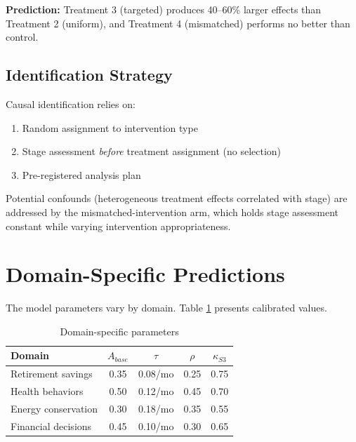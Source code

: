 \documentclass[12pt]{article}
\begin{document}
\textbf{Prediction:} Treatment 3 (targeted) produces 40--60\% larger effects than Treatment 2 (uniform), and Treatment 4 (mismatched) performs no better than control.

\subsection{Identification Strategy}

Causal identification relies on:
\begin{enumerate}
    \item Random assignment to intervention type
    \item Stage assessment \textit{before} treatment assignment (no selection)
    \item Pre-registered analysis plan
\end{enumerate}

Potential confounds (heterogeneous treatment effects correlated with stage) are addressed by the mismatched-intervention arm, which holds stage assessment constant while varying intervention appropriateness.



\section{Domain-Specific Predictions}

The model parameters vary by domain. Table \ref{tab:domain} presents calibrated values.

\begin{table}[h]
\centering
\begin{tabular}{lcccc}
\toprule
Domain & $A_{base}$ & $\tau$ & $\rho$ & $\kappa_{S3}$ \\
\midrule
Retirement savings & 0.35 & 0.08/mo & 0.25 & 0.75 \\
Health behaviors & 0.50 & 0.12/mo & 0.45 & 0.70 \\
Energy conservation & 0.30 & 0.18/mo & 0.35 & 0.55 \\
Financial decisions & 0.45 & 0.10/mo & 0.30 & 0.65 \\
\bottomrule
\end{tabular}
\caption{Domain-specific parameters}
\label{tab:domain}
\end{table}
\end{document}

